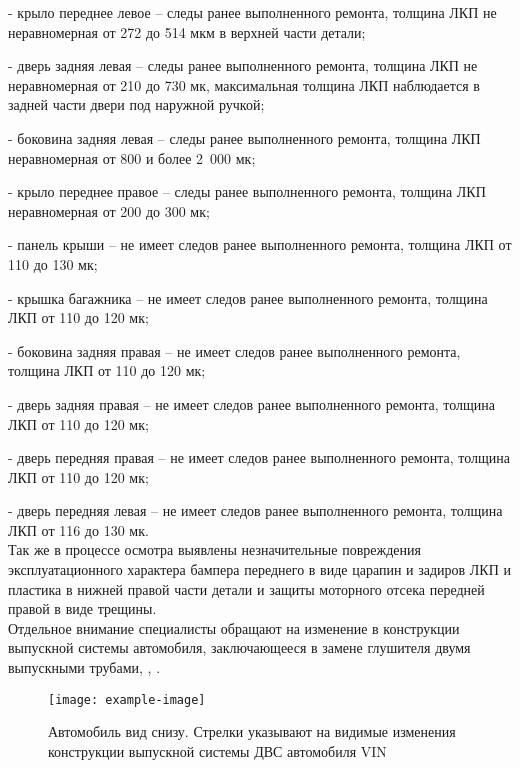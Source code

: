 {- крыло переднее левое – следы ранее выполненного ремонта, толщина ЛКП не неравномерная от 272 до 514 мкм в верхней части детали;

- дверь задняя левая – следы ранее выполненного ремонта, толщина ЛКП не неравномерная от 210 до 730 мк, максимальная толщина ЛКП наблюдается в задней части двери под наружной ручкой;

- боковина задняя левая – следы ранее выполненного ремонта, толщина ЛКП  неравномерная от 800  и более 2 000 мк;

- крыло переднее правое – следы ранее выполненного ремонта, толщина ЛКП неравномерная от 200 до 300 мк;

- панель крыши – не имеет следов ранее выполненного ремонта, толщина ЛКП от 110 до 130 мк;

- крышка багажника – не имеет следов ранее выполненного ремонта, толщина ЛКП от 110 до 120 мк;

- боковина задняя правая – не имеет следов ранее выполненного ремонта, толщина ЛКП от 110 до 120 мк;

- дверь задняя правая – не имеет следов ранее выполненного ремонта, толщина ЛКП от 110 до 120 мк;

- дверь передняя правая – не имеет следов ранее выполненного ремонта, толщина ЛКП от 110 до 120 мк;

- дверь передняя левая – не имеет следов ранее выполненного ремонта, толщина ЛКП от 116 до 130 мк.\\

Так же в процессе осмотра выявлены незначительные повреждения эксплуатационного характера бампера переднего в виде царапин и задиров  ЛКП и пластика в нижней правой части детали и защиты моторного отсека передней правой в виде трещины.\\

Отдельное внимание специалисты обращают на изменение в конструкции выпускной системы автомобиля, заключающееся в замене  глушителя двумя выпускными трубами, , .\\


   \begin{figure}[H]
   	\centering
   	\texttt{[image: example-image]}
    \label{constr}
   	\caption{Автомобиль вид снизу. Стрелки указывают на видимые изменения конструкции выпускной системы ДВС автомобиля  VIN \vin}
     \end{figure}
   
}
